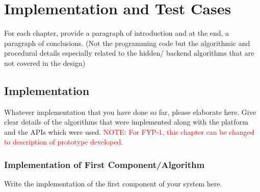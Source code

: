 \chapter{Implementation and Test Cases}
For each chapter, provide a paragraph of introduction and at the end, a paragraph of conclusions. (Not the programming code but the algorithmic and procedural details especially related to the hidden/ backend algorithms that are not covered in the design)
\section{Implementation}
Whatever implementation that you have done so far, please elaborate here.
Give clear details of the algorithms that were implemented along with the platform and the APIs which were used. 
\textcolor{red}{NOTE: For FYP-1, this chapter can be changed to description of prototype developed.}
\subsection{Implementation of First Component/Algorithm}
Write the implementation of the first component of your system here.
